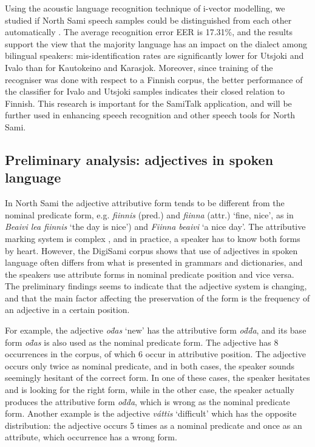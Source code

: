 \documentclass[runningheads,a4paper]{llncs}
\newcommand{\dbar}{\mbox{d\hspace{-.35em}\={}}}
\begin{document}
Using the acoustic language recognition technique of i-vector modelling, we studied if North Sami speech samples could be distinguished from each other automatically \cite{Jokinen:ea:Interspeech:16}. The average recognition error EER is 17.31\%, and the results support the view that the majority language has an impact on the dialect among bilingual speakers: mis-identification rates are significantly lower for Utsjoki and Ivalo than for Kautokeino and Karasjok. Moreover, since training of the recogniser was done with respect to a Finnish corpus, the better performance of the classifier for Ivalo and Utsjoki samples indicates their closed relation to Finnish. This research is important for the SamiTalk application, and
will be further used in enhancing speech recognition and other speech tools for North Sami.

\subsection{Preliminary analysis: adjectives in spoken language}

In North Sami the adjective attributive form tends to be different from the nominal predicate form, e.g.
\textit{fiinnis} (pred.) and \textit{fiinna} (attr.) `fine, nice', as in \textit{Beaivi lea fiinnis} `the day is nice') and \textit{Fiinna beaivi} `a nice day'.
The attributive marking system is complex \cite{Sammallahti:98}, and in practice, a speaker has to know both forms by heart. However, the DigiSami corpus shows that use of adjectives in spoken language often differs from what is presented in grammars and dictionaries, and the speakers use attribute forms in nominal predicate position and vice versa. The preliminary findings seems to indicate that the adjective system is changing, and that the main factor affecting the preservation of the form is the frequency of an adjective in a certain position.

For example, the adjective \textit{o{\dbar}as} `new' has the attributive form \textit{o{\dbar}{\dbar}a}, and its base form \textit{o{\dbar}as} is also used as the nominal predicate form. The adjective has 8 occurrences in the corpus, of which 6 occur in attributive position. The adjective occurs only twice as nominal predicate, and in both cases, the speaker sounds seemingly hesitant of the correct form. In one of these cases, the speaker hesitates and is looking for the right form, while in the other case, the speaker actually produces the attributive form \textit{o{\dbar}{\dbar}a}, which is wrong as the nominal predicate form. Another example is the adjective \textit{v\'attis} `difficult' which has the opposite distribution: the adjective occurs 5 times as a nominal predicate and once as an attribute, which occurrence has a wrong form.
\end{document}

